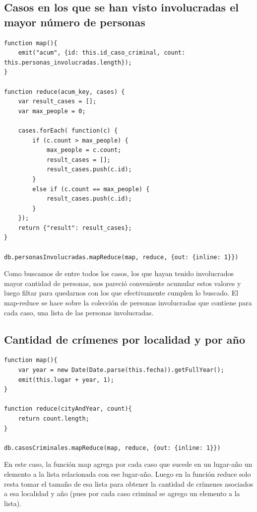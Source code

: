 \documentclass[10pt,a4paper]{article}
\begin{document}
\subsection{Casos en los que se han visto involucradas el mayor número de personas}
\begin{lstlisting}
function map(){
	emit("acum", {id: this.id_caso_criminal, count: this.personas_involucradas.length});
}

function reduce(acum_key, cases) {
	var result_cases = [];
	var max_people = 0;
	
	cases.forEach( function(c) {
		if (c.count > max_people) {
			max_people = c.count;
			result_cases = [];
			result_cases.push(c.id);
		}
		else if (c.count == max_people) {
			result_cases.push(c.id);
		}
	});
	return {"result": result_cases};
}

db.personasInvolucradas.mapReduce(map, reduce, {out: {inline: 1}})
\end{lstlisting}

Como buscamos de entre todos los casos, los que hayan tenido involucrados mayor cantidad de personas, nos pareció conveniente acumular estos valores y luego filtar para quedarnos con los que efectivamente cumplen lo buscado.
El map-reduce se hace sobre la colección de personas involucradas que contiene para cada caso, una lista de las personas involucradas.

\subsection{Cantidad de crímenes por localidad y por año}

\begin{lstlisting}
function map(){
	var year = new Date(Date.parse(this.fecha)).getFullYear();
	emit(this.lugar + year, 1);
}

function reduce(cityAndYear, count){
	return count.length;
}

db.casosCriminales.mapReduce(map, reduce, {out: {inline: 1}})
\end{lstlisting}

En este caso, la función map agrega por cada caso que sucede en un lugar-año un elemento a la lista relacionada con ese lugar-año. Luego en la función reduce solo resta tomar el tamaño de esa lista para obtener la cantidad de crímenes asociados a esa localidad y año (pues por cada caso criminal se agrego un elemento a la lista).
\end{document}
